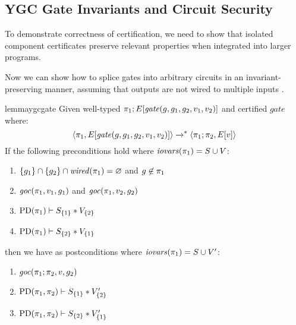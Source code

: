 \subsection{YGC Gate Invariants and Circuit Security}
\label{section-composition-metatheory}

To demonstrate correctness of certification, we need to show that
isolated component certificates preserve relevant properties
when integrated into larger programs. 

Now we can show how to splice gates into arbitrary circuits in an
invariant-preserving manner, assuming that outputs are not wired to
multiple inputs \cite{tate2003garbled,nieminen2023breaking}.
\begin{restatable}{lemma}{ygcgate}
  \label{lemma-ygc-preservation}
Given well-typed $\pi_1;E[\mathit{gate}(g,g_1,g_2,v_1,v_2)]$ and certified $\mathit{gate}$ where:
$$
\langle \pi_1,E[\mathit{gate}(g,g_1,g_2,v_1,v_2)] \rangle \xrightarrow{}^{*} \langle \pi_1;\pi_2,E[v] \rangle
$$
If the following preconditions hold where $\mathit{iovars}(\pi_1) = S \cup V$:
\begin{enumerate}
\item $\{ g_1 \} \cap \{ g_2 \} \cap \mathit{wired}(\pi_1) = \varnothing$ and $g \not\in \pi_1$
\item $\mathit{goc}(\pi_1,v_1,g_1)$ and $\mathit{goc}(\pi_1,v_2,g_2)$
\item $\mathrm{PD}(\pi_1) \vdash S_{\{1\}} * V_{\{2\}}$
\item $\mathrm{PD}(\pi_1) \vdash S_{\{2\}} * V_{\{1\}}$
\end{enumerate}
then we have as postconditions where $\mathit{iovars}(\pi_1) = S \cup V'$:
\begin{enumerate}
\item $\mathit{goc}(\pi_1;\pi_2,v,g_2)$
\item $\mathrm{PD}(\pi_1,\pi_2) \vdash S_{\{1\}} * V'_{\{2\}}$
\item $\mathrm{PD}(\pi_1,\pi_2) \vdash S_{\{2\}} * V'_{\{1\}}$
\end{enumerate}
\end{restatable}

